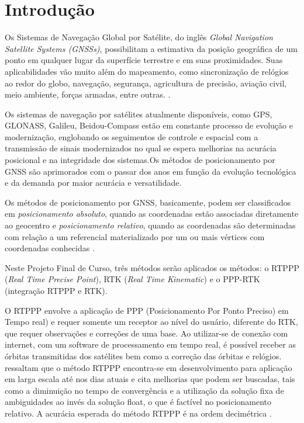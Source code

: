 \chapter{Introdução}

Os Sistemas de Navegação Global por Satélite, do inglês \textit{Global Navigation Satellite Systems (GNSSs)}, possibilitam a estimativa da posição geográfica de um ponto em qualquer lugar da superfície terrestre e em suas proximidades. Suas aplicabilidades vão muito além do mapeamento, como sincronização de relógios ao redor do globo, navegação, segurança, agricultura de precisão, aviação civil, meio ambiente, forças armadas, entre outras. \citep{liu2018real} \citep{monico2008}.

Os sistemas de navegação por satélites atualmente disponíveis, como GPS, GLONASS, Galileu, Beidou-Compass estão em constante processo de evolução e modernização, englobando os seguimentos de controle e espacial com a transmissão de sinais modernizados no qual se espera melhorias na acurácia posicional e na integridade dos sistemas.Os métodos de posicionamento por GNSS são aprimorados com o passar dos anos em função da evolução tecnológica e da demanda por maior acurácia e versatilidade.

Os métodos de posicionamento por GNSS, basicamente, podem ser classificados em \textit{posicionamento absoluto}, quando as coordenadas estão associadas diretamente ao geocentro e \textit{posicionamento relativo}, quando as coordenadas são determinadas com relação a um referencial materializado por um ou mais vértices com coordenadas conhecidas \citep{monico2008}.

Neste Projeto Final de Curso, três métodos serão aplicados os métodos: o RTPPP (\textit{Real Time Precise Point}), RTK (\textit{Real Time Kinematic}) e o PPP-RTK (integração RTPPP e RTK).


O RTPPP envolve a aplicação de PPP (Posicionamento Por Ponto Preciso) em Tempo real) e requer somente um receptor ao nível do usuário, diferente do RTK, que requer observações e correções de uma base.  Ao utilizar-se de conexão com internet, com um software de processamento em tempo real, é possível receber as órbitas transmitidas dos satélites bem como a correção das órbitas e relógios. \citet{marques2014ppp} ressaltam que o método RTPPP encontra-se em desenvolvimento para aplicação em larga escala até nos dias atuais e cita melhorias que podem ser buscadas, tais como a diminuição no tempo de convergência e a utilização da solução fixa de ambiguidades ao invés da solução float, o que é factível no posicionamento relativo. A acurácia esperada do método RTPPP é na ordem decimétrica \citep{lima}.

